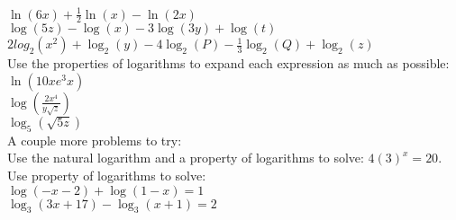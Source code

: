 \documentclass[11pt]{scrartcl}
\theoremstyle{definition}
\begin{document}
\noindent
$\ln(6x)+\frac{1}{2}\ln(x)-\ln(2x)$\\

\noindent
$\log(5z)-\log(x)-3\log(3y)+\log(t)$\\

\noindent
$2log_2(x^2)+\log_2(y)-4\log_2(P)-\frac{1}{3}\log_2(Q)+\log_2(z)$\\

\noindent
Use the properties of logarithms to expand each expression as much as possible:\\

\noindent
$\ln(10xe^3x)$\\

\noindent
$\log\left(\frac{2x^4}{y\sqrt{z}} \right)$\\

\noindent
$\log_5(\sqrt{5z})$\\

\noindent
A couple more problems to try:\\

\noindent
Use the natural logarithm and a property of logarithms to solve: $4(3)^x=20$.\\

\noindent
Use property of logarithms to solve:\\

\noindent
$\log(-x-2)+\log(1-x)=1$\\

\noindent
$\log_3(3x+17)-\log_3(x+1)=2$
\end{document}

